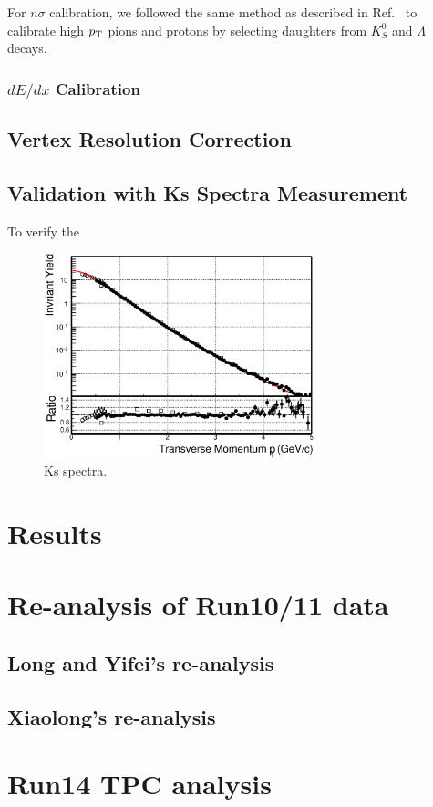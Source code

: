 \documentclass[a4paper]{article}
\begin{document}
For $n\sigma$ calibration, we followed the same method as described in Ref.~\cite{Xu:2008th} to calibrate high $p_{\rm T}$ pions and protons by selecting daughters from $K_{S}^0$ and $\Lambda$ decays.

\subsubsection{$dE/dx$ Calibration}

\subsection{Vertex Resolution Correction}

\subsection{Validation with Ks Spectra Measurement}

To verify the 

\begin{figure}
\centering
\includegraphics[width=0.7\textwidth]{fig/Ks_spectra_PtCut_0.eps}
\caption{\label{fig:Ks_spectra}Ks spectra.}
\end{figure}

\section{\label{results}Results}

\section{\label{Run1011}Re-analysis of Run10/11 data}

\subsection{Long and Yifei's re-analysis}

\subsection{Xiaolong's re-analysis}

\section{\label{Run14TPC}Run14 TPC analysis}



\end{document}
